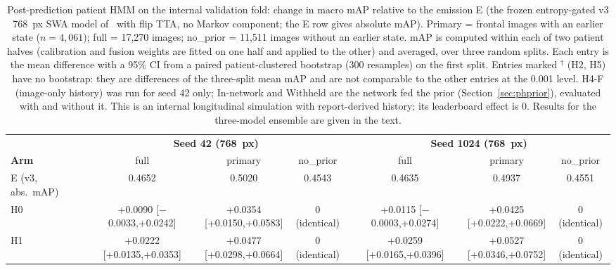 \documentclass[conference]{IEEEtran}
\begin{document}
\begin{table}[htbp]
\caption{Post-prediction patient HMM on the internal validation fold: change in macro mAP relative to the emission E (the frozen entropy-gated v3 768~px SWA model of~\cite{b25} with flip TTA, no Markov component; the E row gives absolute mAP). Primary = frontal images with an earlier state ($n = 4{,}061$); full = 17,270 images; no\_prior = 11,511 images without an earlier state. mAP is computed within each of two patient halves (calibration and fusion weights are fitted on one half and applied to the other) and averaged, over three random splits. Each entry is the mean difference with a 95\% CI from a paired patient-clustered bootstrap (300 resamples) on the first split. Entries marked $^\dagger$ (H2, H5) have no bootstrap: they are differences of the three-split mean mAP and are not comparable to the other entries at the 0.001 level. H4-F (image-only history) was run for seed 42 only; In-network and Withheld are the network fed the prior (Section~\ref{sec:phprior}), evaluated with and without it. This is an internal longitudinal simulation with report-derived history; its leaderboard effect is 0. Results for the three-model ensemble are given in the text.}
\begin{center}
\footnotesize
\setlength{\tabcolsep}{3pt}
\begin{tabular}{|l|c|c|c|c|c|c|}
\hline
 & \multicolumn{3}{c|}{\textbf{Seed 42 (768~px)}} & \multicolumn{3}{c|}{\textbf{Seed 1024 (768~px)}} \\
\textbf{Arm} & full & primary & no\_prior & full & primary & no\_prior \\
\hline
E (v3, abs.\ mAP) & 0.4652 & 0.5020 & 0.4543 & 0.4635 & 0.4937 & 0.4551 \\
\hline
H0 & \shortstack{+0.0090\\{[$-$0.0033,+0.0242]}} & \shortstack{+0.0354\\{[+0.0150,+0.0583]}} & 0 (identical) & \shortstack{+0.0115\\{[$-$0.0003,+0.0274]}} & \shortstack{+0.0425\\{[+0.0222,+0.0669]}} & 0 (identical) \\
H1 & \shortstack{+0.0222\\{[+0.0135,+0.0353]}} & \shortstack{+0.0477\\{[+0.0298,+0.0664]}} & 0 (identical) & \shortstack{+0.0259\\{[+0.0165,+0.0396]}} & \shortstack{+0.0527\\{[+0.0346,+0.0752]}} & 0 (identical) \\

\end{tabular}
\end{center}
\end{table}
\end{document}
